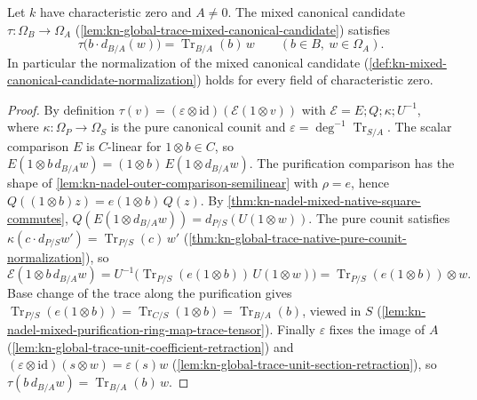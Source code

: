 \begin{theorem}
\label{thm:kn-nadel-mixed-candidate-normalization}
\leanok
Let $k$ have characteristic zero and $A\neq0$. The mixed canonical candidate
$\tau:\Omega_B\to\Omega_A$ (\cref{lem:kn-global-trace-mixed-canonical-candidate})
satisfies
\[
 \tau\bigl(b\cdot d_{B/A}(w)\bigr)=\operatorname{Tr}_{B/A}(b)\,w
 \qquad(b\in B,\ w\in\Omega_A).
\]
In particular the normalization of the mixed canonical candidate
(\cref{def:kn-mixed-canonical-candidate-normalization}) holds for every field of
characteristic zero.
\end{theorem}
\begin{proof}
By definition $\tau(v)=(\varepsilon\otimes\mathrm{id})(\mathcal E(1\otimes v))$ with
$\mathcal E=E;Q;\kappa;U^{-1}$, where $\kappa:\Omega_P\to\Omega_S$ is the pure
canonical counit and $\varepsilon=\deg^{-1}\operatorname{Tr}_{S/A}$. The scalar
comparison $E$ is $C$-linear for $1\otimes b\in C$, so
$E(1\otimes b\,d_{B/A}w)=(1\otimes b)\,E(1\otimes d_{B/A}w)$. The purification
comparison has the shape of \cref{lem:kn-nadel-outer-comparison-semilinear} with
$\rho=e$, hence
$Q((1\otimes b)z)=e(1\otimes b)\,Q(z)$. By
\cref{thm:kn-nadel-mixed-native-square-commutes},
$Q(E(1\otimes d_{B/A}w))=d_{P/S}(U(1\otimes w))$. The pure counit satisfies
$\kappa(c\cdot d_{P/S}w')=\operatorname{Tr}_{P/S}(c)\,w'$
(\cref{thm:kn-global-trace-native-pure-counit-normalization}), so
\[
 \mathcal E(1\otimes b\,d_{B/A}w)
 =U^{-1}\bigl(\operatorname{Tr}_{P/S}(e(1\otimes b))\,U(1\otimes w)\bigr)
 =\operatorname{Tr}_{P/S}(e(1\otimes b))\otimes w .
\]
Base change of the trace along the purification gives
$\operatorname{Tr}_{P/S}(e(1\otimes b))=\operatorname{Tr}_{C/S}(1\otimes b)
=\operatorname{Tr}_{B/A}(b)$, viewed in $S$
(\cref{lem:kn-nadel-mixed-purification-ring-map-trace-tensor}). Finally
$\varepsilon$ fixes the image of $A$
(\cref{lem:kn-global-trace-unit-coefficient-retraction}) and
$(\varepsilon\otimes\mathrm{id})(s\otimes w)=\varepsilon(s)w$
(\cref{lem:kn-global-trace-unit-section-retraction}), so
$\tau(b\,d_{B/A}w)=\operatorname{Tr}_{B/A}(b)\,w$.
\end{proof}

